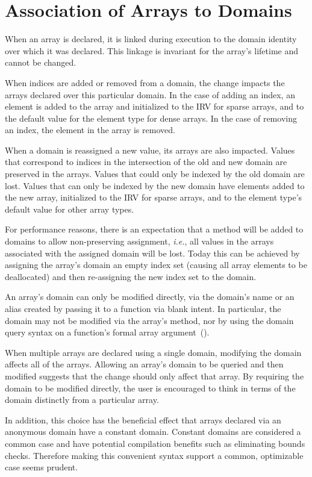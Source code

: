 \section{Association of Arrays to Domains}
\label{Association_of_Arrays_to_Domains}

%
%

When an array is declared, it is linked during execution to the domain
identity over which it was declared.  This linkage is invariant for
the array's lifetime and cannot be changed.

When indices are added or removed from a domain, the change impacts
the arrays declared over this particular domain.  In the case of
adding an index, an element is added to the array and initialized to
the IRV for sparse arrays, and to the default value for the element
type for dense arrays.  In the case of removing an index, the element
in the array is removed.

When a domain is reassigned a new value, its arrays are also impacted.
Values that correspond to indices in the intersection of the old and
new domain are preserved in the arrays.  Values that could only be
indexed by the old domain are lost.  Values that can only be indexed
by the new domain have elements added to the new array, initialized to
the IRV for sparse arrays, and to the element type's default value for
other array types.

For performance reasons, there is an expectation that a method will be
added to domains to allow non-preserving assignment, \emph{i.e.}, all
values in the arrays associated with the assigned domain will be lost.
Today this can be achieved by assigning the array's domain an empty
index set (causing all array elements to be deallocated) and then
re-assigning the new index set to the domain.

An array's domain can only be modified directly, via the domain's name
or an alias created by passing it to a function via blank intent.  In
particular, the domain may not be modified via the array's
 method, nor by using the domain query syntax on a
function's formal array
argument~().

\begin{rationale}
When multiple arrays are declared using a single domain, modifying the
domain affects all of the arrays.  Allowing an array's domain to be
queried and then modified suggests that the change should only affect
that array.  By requiring the domain to be modified directly, the user
is encouraged to think in terms of the domain distinctly from a
particular array.

In addition, this choice has the beneficial effect that arrays
declared via an anonymous domain have a constant domain.  Constant
domains are considered a common case and have potential compilation
benefits such as eliminating bounds checks.  Therefore making this
convenient syntax support a common, optimizable case seems prudent.
\end{rationale}


